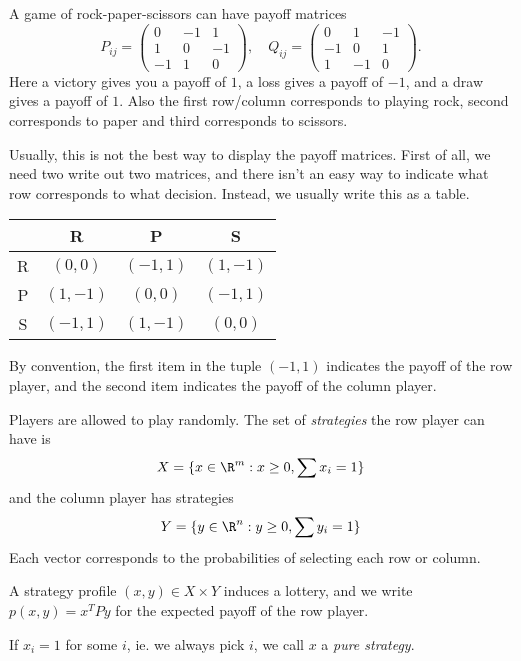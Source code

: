 \documentclass[a4paper]{article}
\begin{document}
\begin{eg}
  A game of rock-paper-scissors can have payoff matrices
  \[
    P_{ij} =
    \begin{pmatrix}
      0 & -1 & 1\\
      1 & 0 & -1\\
      -1 & 1 & 0
    \end{pmatrix},\quad
    Q_{ij} =
    \begin{pmatrix}
      0 & 1 & -1\\
      -1 & 0 & 1\\
      1 & -1 & 0
    \end{pmatrix}.
  \]
  Here a victory gives you a payoff of $1$, a loss gives a payoff of $-1$, and a draw gives a payoff of $1$. Also the first row/column corresponds to playing rock, second corresponds to paper and third corresponds to scissors.

  Usually, this is not the best way to display the payoff matrices. First of all, we need two write out two matrices, and there isn't an easy way to indicate what row corresponds to what decision. Instead, we usually write this as a table.
  \begin{center}
    \begin{tabular}{cccc}
      \toprule
      & R & P & S\\
      \midrule
      R & $(0, 0)$ & $(-1, 1)$ & $(1, -1)$\\
      P & $(1, -1)$ & $(0, 0)$ & $(-1, 1)$\\
      S & $(-1, 1)$ & $(1, -1)$ & $(0, 0)$\\
      \bottomrule
    \end{tabular}
  \end{center}
  By convention, the first item in the tuple $(-1, 1)$ indicates the payoff of the row player, and the second item indicates the payoff of the column player.
\end{eg}
\begin{defi}[Strategy]
  Players are allowed to play randomly. The set of \emph{strategies} the row player can have is
  \[
    X = \{x\in \R^m: x \geq 0, \sum x_i = 1\}
  \]
  and the column player has strategies
  \[
    Y = \{y\in \R^n: y \geq 0, \sum y_i = 1\}
  \]
  Each vector corresponds to the probabilities of selecting each row or column.

  A strategy profile $(x, y)\in X\times Y$ induces a lottery, and we write $p(x, y) = x^T Py$ for the expected payoff of the row player.

  If $x_i = 1$ for some $i$, ie. we always pick $i$, we call $x$ a \emph{pure strategy}.
\end{defi}
\end{document}
